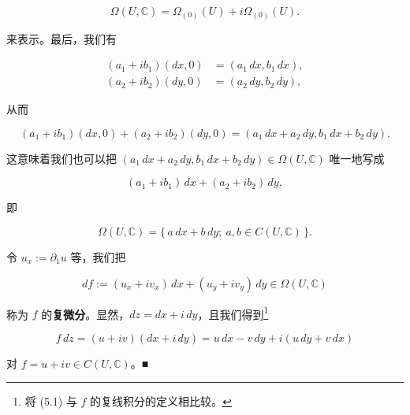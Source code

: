 \begin{remark}
\begin{items}
\[
\Omega(U,\mathbb{C}) = \Omega_{(0)}(U) + i\Omega_{(0)}(U) .
\]

来表示。最后，我们有

\begin{equation*}
\begin{aligned}
(a_{1} + ib_{1})(dx,0) &= (a_{1}\,dx, b_{1}\,dx) , \\ (a_{2} + ib_{2})(dy,0) &= (a_{2}\,dy, b_{2}\,dy) ,
\end{aligned}
\end{equation*}

从而

\[
(a_{1} + ib_{1})(dx,0) + (a_{2} + ib_{2})(dy,0) = (a_{1}\,dx + a_{2}\,dy, b_{1}\,dx + b_{2}\,dy) .
\]

这意味着我们也可以把 $ (a_{1}\,dx + a_{2}\,dy, b_{1}\,dx + b_{2}\,dy) \in \Omega(U,\mathbb{C}) $ 唯一地写成

\[
(a_{1} + ib_{1})\,dx + (a_{2} + ib_{2})\,dy ,
\]

即

\[
\Omega(U,\mathbb{C}) = \{\, a\,dx + b\,dy ;\ a,b \in C(U,\mathbb{C}) \,\} .
\]
\item

令 $ u_{x} := \partial_{1}u $ 等，我们把

\[
df := (u_{x} + iv_{x})\,dx + (u_{y} + iv_{y})\,dy \in \Omega(U,\mathbb{C})
\]

称为 $ f $ 的\textbf{复微分}。显然，$ dz = dx + i\,dy $，且我们得到\footnote{将 (5.1) 与 $ f $ 的复线积分的定义相比较。}

\begin{equation}
f\,dz = (u + iv)(dx + i\,dy) = u\,dx - v\,dy + i(u\,dy + v\,dx)\tag{5.1}
\end{equation}

对 $ f = u + iv \in C(U,\mathbb{C}) $。\nobreak\hspace{0.35em}■

\end{items}

\end{remark}

